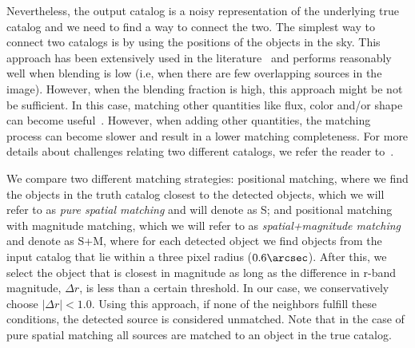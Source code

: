 \documentclass[\docopts]{\docclass}
\begin{document}
Nevertheless, the output catalog is a noisy representation of the underlying true catalog and we need to find a way to connect the two. 
The simplest way to connect two catalogs is by using the positions of the objects in the sky. This approach has been extensively used in the literature~\citep{1977A&AS...28..211D,1983Obs...103..150B,1986MNRAS.223..279W} and performs reasonably well when blending is low (i.e, when there are few overlapping sources in the image). However, when the blending fraction is high, this approach might be not be sufficient. In this case, matching other quantities like flux, color and/or shape can become useful~\citep{2008ApJ...679..301B, doi:10.1146/annurev-statistics-010814-020231}. However, when adding other quantities, the matching process can become slower and result in a lower matching completeness. For more details about challenges relating two different catalogs, we refer the reader to~\citet{doi:10.1146/annurev-statistics-010814-020231}. 

We compare two different matching strategies: positional matching, where we find the objects in the truth catalog closest to the detected objects, which we will refer to as \textit{pure spatial matching} and will denote as \textsf{S}; and positional matching with magnitude matching, which we will refer to as \textit{spatial+magnitude matching} and denote as \textsf{S+M}, where for each detected object we find objects from the input catalog that lie within a three pixel radius ($0.6 \arcsec$). After this, we select the object that is closest in magnitude as long as the difference in r-band magnitude, $\Delta r$, is less than a certain threshold. In our case, we conservatively choose $|\Delta r| < 1.0$. Using this approach, if none of the neighbors fulfill these conditions, the detected source is considered unmatched. Note that in the case of pure spatial matching all sources are matched to an object in the true catalog.
\end{document}
